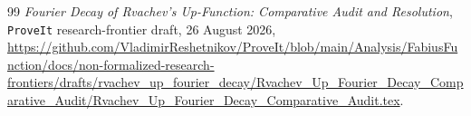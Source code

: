 \documentclass[11pt,oneside]{article}
\theoremstyle{definition}
\theoremstyle{remark}
\begin{document}
\begin{thebibliography}{99}
\emph{Fourier Decay of Rvachev's Up-Function: Comparative Audit and Resolution},
\newblock \texttt{ProveIt} research-frontier draft, 26 August 2026,
\newblock \url{https://github.com/VladimirReshetnikov/ProveIt/blob/main/Analysis/FabiusFunction/docs/non-formalized-research-frontiers/drafts/rvachev_up_fourier_decay/Rvachev_Up_Fourier_Decay_Comparative_Audit/Rvachev_Up_Fourier_Decay_Comparative_Audit.tex}.

\end{thebibliography}
\end{document}
